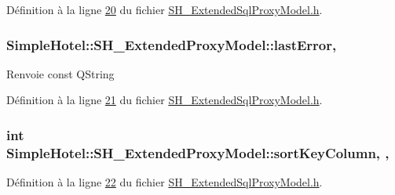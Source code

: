 Définition à la ligne \hyperlink{SH__ExtendedSqlProxyModel_8h_source_l00020}{20} du fichier \hyperlink{SH__ExtendedSqlProxyModel_8h_source}{S\-H\-\_\-\-Extended\-Sql\-Proxy\-Model.\-h}.

\hypertarget{classSimpleHotel_1_1SH__ExtendedProxyModel_a8b5c74b23d91bde591eba6d32a20c30f}{
\subsubsection[{last\-Error}]{\setlength{\rightskip}{0pt plus 5cm}Simple\-Hotel\-::\-S\-H\-\_\-\-Extended\-Proxy\-Model\-::last\-Error\hspace{0.3cm}{\ttfamily [read]}, {\ttfamily [inherited]}}}\label{classSimpleHotel_1_1SH__ExtendedProxyModel_a8b5c74b23d91bde591eba6d32a20c30f}
\begin{DoxyReturn}{Renvoie}
const Q\-String 
\end{DoxyReturn}


Définition à la ligne \hyperlink{SH__ExtendedSqlProxyModel_8h_source_l00021}{21} du fichier \hyperlink{SH__ExtendedSqlProxyModel_8h_source}{S\-H\-\_\-\-Extended\-Sql\-Proxy\-Model.\-h}.

\hypertarget{classSimpleHotel_1_1SH__ExtendedProxyModel_a879989e7ae305dc2794b281c5e0ab689}{
\subsubsection[{sort\-Key\-Column}]{\setlength{\rightskip}{0pt plus 5cm}int Simple\-Hotel\-::\-S\-H\-\_\-\-Extended\-Proxy\-Model\-::sort\-Key\-Column\hspace{0.3cm}{\ttfamily [read]}, {\ttfamily [write]}, {\ttfamily [inherited]}}}\label{classSimpleHotel_1_1SH__ExtendedProxyModel_a879989e7ae305dc2794b281c5e0ab689}


Définition à la ligne \hyperlink{SH__ExtendedSqlProxyModel_8h_source_l00022}{22} du fichier \hyperlink{SH__ExtendedSqlProxyModel_8h_source}{S\-H\-\_\-\-Extended\-Sql\-Proxy\-Model.\-h}.

